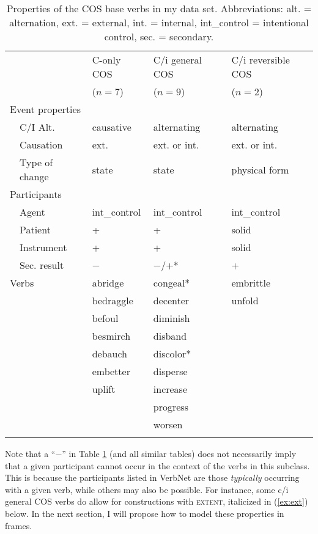 \begin{table}
  \centering 
    \caption[Properties of the COS base verbs in my data set]{\label{tab:cos-overview}Properties of the COS base verbs in my data set. Abbreviations: alt. = alternation, ext. = external, int. = internal, int\_control = intentional control, sec. = secondary.}
    \begin{tabular}{lllll}
      \lsptoprule
      && C-only COS & C/i general COS & C/i reversible COS \\ 
      && ($n=7$) & ($n=9$) & ($n=2$)\\
      \midrule
       \multicolumn{2}{l}{Event properties}  &&& \\
       & C/I Alt. & causative & alternating & alternating \\ 
       & Causation & ext. & ext. or int. & ext. or int. \\ 
       &  Type of change & state & state & physical form \\
      \multicolumn{2}{l}{Participants}&&&\\
       & Agent &int\_control&int\_control&int\_control\\
      & Patient &+&+&solid\\
       & Instrument &+&+&solid\\
      & Sec. result &−&−/+*&+\\
 \multicolumn{2}{l}{Verbs}  & {abridge}  & {congeal}*   & {embrittle}   \\
      && {bedraggle}   & {decenter}   & {unfold}  \\
      && {befoul}    & {diminish}   & {}   \\
      && {besmirch}    & {disband}  & {}   \\
      && {debauch}   & {discolor}*  & {}   \\
      && {embetter}    & {disperse}   & {}  \\
      && {uplift}    & {increase}   & {}   \\
      && {}    & {progress}   & {}    \\
      && {}    & {worsen}   & {}   \\      
      \lspbottomrule 
    \end{tabular} 
\end{table}


Note that a ``−'' in Table \ref{tab:cos-overview} (and all similar tables) does not necessarily imply that a given participant cannot occur in the context of the verbs in this subclass. This is because the participants listed in VerbNet are those \textit{typically} occurring with a given verb, while others may also be possible. For instance, some c/i general COS verbs do allow for constructions with \textsc{extent}, italicized in (\ref{ex:ext}) below. In the next section, I will propose how to model these properties in frames. 

